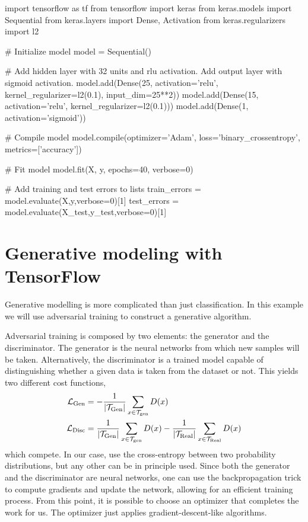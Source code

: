 \documentclass[]{report}
\begin{document}
\begin{boxedverbatim}
import tensorflow as tf
from tensorflow import keras
from keras.models import Sequential
from keras.layers import Dense, Activation
from keras.regularizers import l2

# Initialize model
model = Sequential()

# Add hidden layer with 32 units and rlu activation. Add output layer with sigmoid activation.
model.add(Dense(25, activation='relu', kernel_regularizer=l2(0.1), input_dim=25**2))
model.add(Dense(15, activation='relu', kernel_regularizer=l2(0.1)))
model.add(Dense(1, activation='sigmoid'))

# Compile model
model.compile(optimizer='Adam', loss='binary_crossentropy', metrics=['accuracy'])

# Fit model
model.fit(X, y, epochs=40, verbose=0)

# Add training and test errors to lists
train_errors = model.evaluate(X,y,verbose=0)[1]
test_errors = model.evaluate(X_test,y_test,verbose=0)[1] 
\end{boxedverbatim}
\vskip5mm

\section{Generative modeling with TensorFlow}\label{sec.generative-tensorflow}

Generative modelling is more complicated than just classification. In this example we will use adversarial training to construct a generative algorithm. 

Adversarial training is composed by two elements: the generator and the discriminator. The generator is the neural networks from which new samples will be taken. Alternatively, the discriminator is a trained model capable of distinguishing whether a given data is taken from the dataset or not. This yields two different cost functions,
\begin{align}
\mathcal L_{\rm Gen} & = -\frac{1}{\vert \mathcal T_{\rm Gen} \vert}\sum_{x \in \mathcal T_{\rm gen}} D(x)\\
\mathcal L_{\rm Disc} & = \frac{1}{\vert \mathcal T_{\rm Gen} \vert}\sum_{x \in \mathcal T_{\rm gen}} D(x) - \frac{1}{\vert \mathcal T_{\rm Real} \vert}\sum_{x \in \mathcal T_{\rm Real}} D(x)
\end{align}
which compete. In our case, use the cross-entropy between two probability distributions, but any other can be in principle used. Since both the generator and the discriminator are neural networks, one can use the backpropagation trick to compute gradients and update the network, allowing for an efficient training process. From this point, it is possible to choose an optimizer that completes the work for us. The optimizer just applies gradient-descent-like algorithms. 
\end{document}
